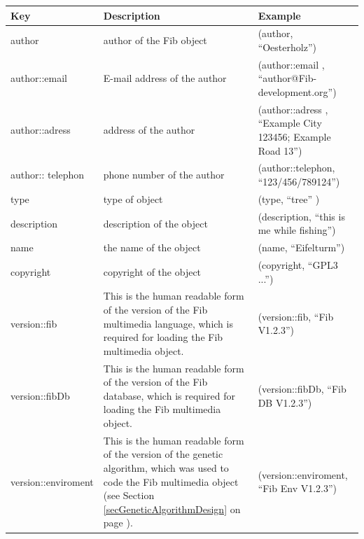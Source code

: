 \begin{small}
\begin{center}
\begin{longtable}{|p{23mm}|p{60mm}|p{40mm}|}\hline
	Key & Description & Example \\\hline\endhead
	author & author of the Fib object & (author, ``Oesterholz'')\\\hline
	author::email & E-mail address of the author & (author::email , ``author@Fib-development.org'')\\\hline
	author::adress & address of the author & (author::adress , ``Example City 123456; Example Road 13'')\\\hline
	author:: telephon & phone number of the author & (author::telephon, ``123/456/789124'')\\\hline
	type & type of object & (type, ``tree'' )\\\hline
	description & description of the object & (description, ``this is me while fishing'')\\\hline
	name & the name of the object & (name, ``Eifelturm'')\\\hline
	copyright & copyright of the object & (copyright, ``GPL3 ...'')\\\hline
	version::fib & This is the human readable form of the version of the Fib multimedia language, which is required for loading the Fib multimedia object. & (version::fib, ``Fib V1.2.3'')\\\hline
	version::fibDb & This is the human readable form of the version of the Fib database, which is required for loading the Fib multimedia object. & (version::fibDb, ``Fib DB V1.2.3'')\\\hline
	version::\-enviroment & This is the human readable form of the version of the genetic algorithm, which was used to code the Fib multimedia object (see Section \ref{secGeneticAlgorithmDesign} on page \pageref{secGeneticAlgorithmDesign}). & (version::enviroment, ``Fib Env V1.2.3'')\\\hline


\end{longtable}
\end{center}
\end{small}
